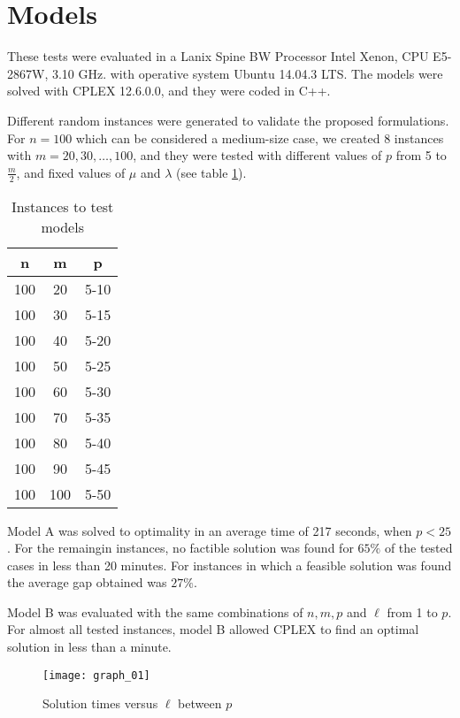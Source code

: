 \section{Models}
%

These tests were evaluated in
a Lanix Spine BW Processor Intel Xenon,
CPU E5-2867W, 3.10 GHz.
with operative system Ubuntu 14.04.3 LTS.
The models were solved with CPLEX 12.6.0.0,
and they were coded in C++.

Different random instances were generated
to validate the proposed formulations.
For $n = 100$
which can be considered a medium-size case,
we created 8 instances with $m = 20,30,\ldots,100$,
and they were tested with different values of $p$ from 5 to $\frac{m}{2}$,
and fixed values of $\mu$ and $\lambda$
(see table \ref{tab:tests}).
\begin{table}
  \centering
  \begin{tabular}{|c|c|c|}\hline
    n & m & p \\ \hline
    100 & 20 & 5-10 \\
    100 & 30 & 5-15 \\
    100 & 40 & 5-20 \\
    100 & 50 & 5-25 \\
    100 & 60 & 5-30 \\
    100 & 70 & 5-35 \\
    100 & 80 & 5-40 \\
    100 & 90 & 5-45 \\
    100 & 100 & 5-50 \\
    \hline
  \end{tabular}
  \caption{Instances to test models}
  \label{tab:tests}
\end{table}

Model A was solved to optimality
in an average time of 217 seconds,
when $p < 25$.
For the remaingin instances,
no factible solution was found
for $65\%$ of the tested cases
in less than 20 minutes.
For instances in which a feasible solution was found
the average gap obtained was $27\%$.

Model B was evaluated
with the same combinations of $n,m,p$
and $\ell$ from 1 to $p$.
For almost all tested instances,
model B allowed CPLEX to find an optimal solution
in less than a minute.
\begin{figure}[!ht]
  \centering
  \texttt{[image: graph\_01]}
  \caption{Solution times versus $\ell$ between $p$}
\end{figure}

